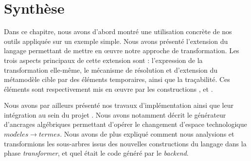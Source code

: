 
\section{Synthèse}
\label{ch:outils:synth}


Dans ce chapitre, nous avons d'abord montré une utilisation concrète de nos
outils appliquée sur un exemple simple. Nous avons présenté l'extension du
langage {\tom} permettant de mettre en œuvre notre approche de transformation.
Les trois aspects principaux de cette extension sont : l'expression de la
transformation elle-même, le mécanisme de résolution et d'extension du
métamodèle cible par des éléments temporaires, ainsi que la traçabilité. Ces
éléments sont respectivement mis en œuvre par les constructions
,  et .

Nous avons  par ailleurs présenté nos travaux d'implémentation ainsi que leur
intégration au sein du projet {\tom}. Nous avons notamment décrit le générateur
d'ancrages algébriques {\tomemf} permettant d'opérer le changement d'espace
technologique $mod\grave eles\rightarrow termes$. Nous avons de plus expliqué
comment nous analysions et transformions les sous-arbres issus des nouvelles
constructions du langage {\tom} dans la phase \emph{transformer}, et quel était
le code généré par le \emph{backend}.

